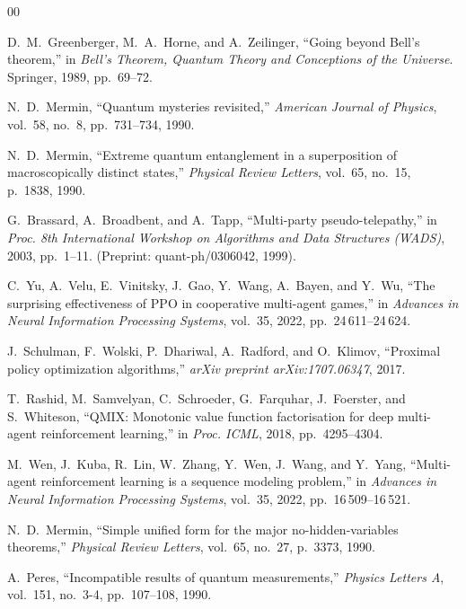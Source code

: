 \documentclass[conference]{IEEEtran}
\begin{document}

\begin{thebibliography}{00}

D.~M.~Greenberger, M.~A.~Horne, and A.~Zeilinger, ``Going beyond Bell's theorem,'' in \emph{Bell's Theorem, Quantum Theory and Conceptions of the Universe}. Springer, 1989, pp.~69--72.

N.~D.~Mermin, ``Quantum mysteries revisited,'' \emph{American Journal of Physics}, vol.~58, no.~8, pp.~731--734, 1990.

N.~D.~Mermin, ``Extreme quantum entanglement in a superposition of macroscopically distinct states,'' \emph{Physical Review Letters}, vol.~65, no.~15, p.~1838, 1990.

G.~Brassard, A.~Broadbent, and A.~Tapp, ``Multi-party pseudo-telepathy,'' in \emph{Proc. 8th International Workshop on Algorithms and Data Structures (WADS)}, 2003, pp.~1--11. (Preprint: quant-ph/0306042, 1999).

C.~Yu, A.~Velu, E.~Vinitsky, J.~Gao, Y.~Wang, A.~Bayen, and Y.~Wu, ``The surprising effectiveness of PPO in cooperative multi-agent games,'' in \emph{Advances in Neural Information Processing Systems}, vol.~35, 2022, pp.~24\,611--24\,624.

J.~Schulman, F.~Wolski, P.~Dhariwal, A.~Radford, and O.~Klimov, ``Proximal policy optimization algorithms,'' \emph{arXiv preprint arXiv:1707.06347}, 2017.

T.~Rashid, M.~Samvelyan, C.~Schroeder, G.~Farquhar, J.~Foerster, and S.~Whiteson, ``QMIX: Monotonic value function factorisation for deep multi-agent reinforcement learning,'' in \emph{Proc. ICML}, 2018, pp.~4295--4304.

M.~Wen, J.~Kuba, R.~Lin, W.~Zhang, Y.~Wen, J.~Wang, and Y.~Yang, ``Multi-agent reinforcement learning is a sequence modeling problem,'' in \emph{Advances in Neural Information Processing Systems}, vol.~35, 2022, pp.~16\,509--16\,521.

N.~D.~Mermin, ``Simple unified form for the major no-hidden-variables theorems,'' \emph{Physical Review Letters}, vol.~65, no.~27, p.~3373, 1990.

A.~Peres, ``Incompatible results of quantum measurements,'' \emph{Physics Letters A}, vol.~151, no.~3-4, pp.~107--108, 1990.

\end{thebibliography}
\end{document}
